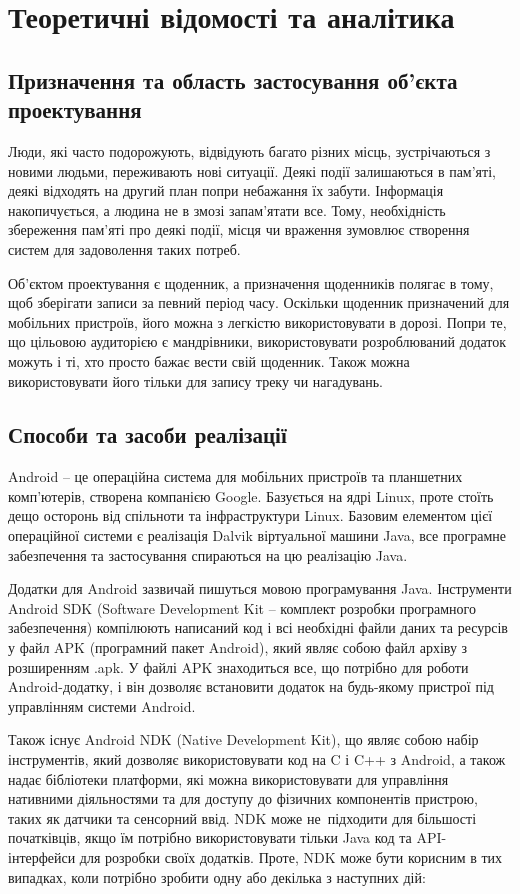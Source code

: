 \documentclass[../main.tex]{subfiles}
\begin{document}
\chapter{Теоретичні відомості та аналітика}

\section{Призначення та область застосування об'єкта проектування}

Люди, які часто подорожують, відвідують багато різних місць, зустрічаються з новими людьми, переживають нові ситуації. Деякі події залишаються в пам'яті, деякі відходять на другий план попри небажання їх забути. Інформація накопичується, а людина не в змозі запам'ятати все. Тому, необхідність збереження пам'яті про деякі події, місця чи враження зумовлює створення систем для задоволення таких потреб.

Об'єктом проектування є щоденник, а призначення щоденників полягає в тому, щоб зберігати записи за певний період часу. Оскільки щоденник призначений для мобільних пристроїв, його можна з легкістю використовувати в дорозі. Попри те, що цільовою аудиторією є мандрівники, використовувати розроблюваний додаток можуть і ті, хто просто бажає вести свій щоденник. Також можна використовувати його тільки для запису треку чи нагадувань.

\section{Способи та засоби реалізації}

Android -- це операційна система для мобільних пристроїв та планшетних комп'ютерів, створена компанією Google. Базується на ядрі Linux, проте стоїть дещо осторонь від спільноти та інфраструктури Linux. Базовим елементом цієї операційної системи є реалізація Dalvik віртуальної машини Java, все програмне забезпечення та застосування спираються на цю реалізацію Java.

Додатки для Android зазвичай пишуться мовою програмування Java. Інструменти Android SDK (Software Development Kit -- комплект розробки програмного забезпечення) компілюють написаний код і всі необхідні файли даних та ресурсів у файл APK (програмний пакет Android), який являє собою файл архіву з розширенням .apk. У файлі APK знаходиться все, що потрібно для роботи Android-додатку, і він дозволяє встановити додаток на будь-якому пристрої під управлінням системи Android. 

Також існує Android NDK (Native Development Kit), що являє собою набір інструментів, який дозволяє використовувати код на C і C++ з Android, а також надає бібліотеки платформи, які можна використовувати для управління нативними діяльностями та для доступу до фізичних компонентів пристрою, таких як датчики та сенсорний ввід. NDK може не~підходити для більшості початківців, якщо їм потрібно використовувати тільки Java код та API-інтерфейси для розробки своїх додатків. Проте, NDK може бути корисним в тих випадках, коли потрібно зробити одну або декілька з наступних дій:
\end{document}
